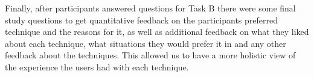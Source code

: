 Finally, after participants answered questions for Task B there were some final study questions to get quantitative feedback on the participants preferred technique and the reasons for it, as well as additional feedback on what they liked about each technique, what situations they would prefer it in and any other feedback about the techniques. This allowed us to have a more holistic view of the experience the users had with each technique.



